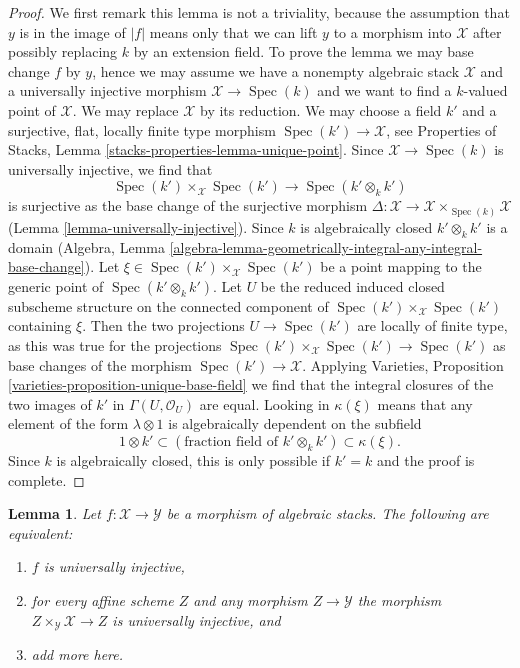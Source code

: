 \documentclass{stacks-project}
\theoremstyle{plain}
\newtheorem{lemma}[subsection]{Lemma}
\theoremstyle{definition}
\theoremstyle{remark}
\numberwithin{equation}{subsection}
\def\Spec{\mathop{\mathrm{Spec}}}
\begin{document}
\begin{proof}
We first remark this lemma is not a triviality, because the assumption that
$y$ is in the image of $|f|$ means only that we can lift
$y$ to a morphism into $\mathcal{X}$ after possibly replacing
$k$ by an extension field. To prove the lemma we may base change
$f$ by $y$, hence we may assume we have a nonempty algebraic stack
$\mathcal{X}$ and a universally injective morphism
$\mathcal{X} \to \Spec(k)$ and we want to find a $k$-valued point
of $\mathcal{X}$. We may replace $\mathcal{X}$ by its reduction.
We may choose a field $k'$ and a surjective, flat, locally finite type morphism
$\Spec(k') \to \mathcal{X}$, see
Properties of Stacks, Lemma \ref{stacks-properties-lemma-unique-point}.
Since $\mathcal{X} \to \Spec(k)$ is universally injective, we find that
$$
\Spec(k') \times_\mathcal{X} \Spec(k') \to \Spec(k' \otimes_k k')
$$
is surjective as the base change of the surjective morphism
$\Delta : \mathcal{X} \to \mathcal{X} \times_{\Spec(k)} \mathcal{X}$
(Lemma \ref{lemma-universally-injective}).
Since $k$ is algebraically closed $k' \otimes_k k'$ is a domain
(Algebra, Lemma
\ref{algebra-lemma-geometrically-integral-any-integral-base-change}).
Let $\xi \in \Spec(k') \times_\mathcal{X} \Spec(k')$
be a point mapping to the generic point of $\Spec(k' \otimes_k k')$.
Let $U$ be the reduced induced closed subscheme structure on
the connected component of $\Spec(k') \times_\mathcal{X} \Spec(k')$
containing $\xi$. Then the two projections $U \to \Spec(k')$
are locally of finite type, as this was true for the projections
$\Spec(k') \times_\mathcal{X} \Spec(k') \to \Spec(k')$
as base changes of the morphism $\Spec(k') \to \mathcal{X}$.
Applying
Varieties, Proposition \ref{varieties-proposition-unique-base-field}
we find that the integral closures of the two images
of $k'$ in $\Gamma(U, \mathcal{O}_U)$ are equal.
Looking in $\kappa(\xi)$ means that any element of the form
$\lambda \otimes 1$ is algebraically dependent on
the subfield
$$
1 \otimes k' \subset 
(\text{fraction field of }k' \otimes_k k') \subset
\kappa(\xi).
$$
Since $k$ is algebraically closed, this is only possible
if $k' = k$ and the proof is complete.
\end{proof}

\begin{lemma}
\label{lemma-universally-injective-local}
Let $f : \mathcal{X} \to \mathcal{Y}$ be a morphism of algebraic stacks.
The following are equivalent:
\begin{enumerate}
\item $f$ is universally injective,
\item for every affine scheme $Z$ and any morphism
$Z \to \mathcal{Y}$ the morphism $Z \times_\mathcal{Y} \mathcal{X} \to Z$
is universally injective, and
\item add more here.
\end{enumerate}
\end{lemma}
\end{document}
